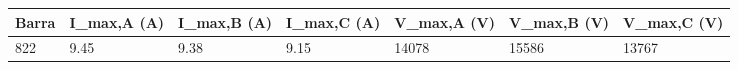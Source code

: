 \begin{tabular}{lllllll}
\toprule
Barra & I_{max,A} (A) & I_{max,B} (A) & I_{max,C} (A) & V_{max,A} (V) & V_{max,B} (V) & V_{max,C} (V) \\
\midrule
822 & 9.45 & 9.38 & 9.15 & 14078 & 15586 & 13767 \\
\bottomrule
\end{tabular}
